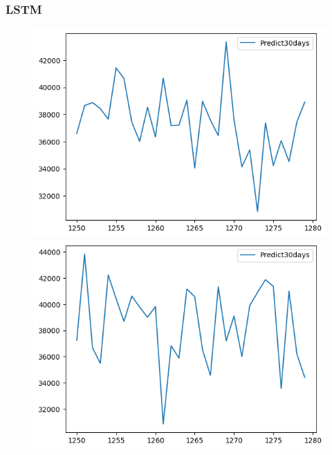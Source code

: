 \subsubsection{LSTM}
\begin{figure}[H]
    \centering
    \begin{minipage}{0.15\textwidth}
    \centering
    \includegraphics[width=1\textwidth]{resources/chapter-5/predicted/BIDV_ML_7_3_next30days.png}
    \end{minipage}
    \hfill
    \begin{minipage}{0.15\textwidth}
    \centering
    \includegraphics[width=1\textwidth]{resources/chapter-5/predicted/BIDV_ML_8_2_next30days.png}
    \end{minipage}
    \hfill
        \begin{minipage}{0.15\textwidth}

\end{minipage}
\end{figure}

